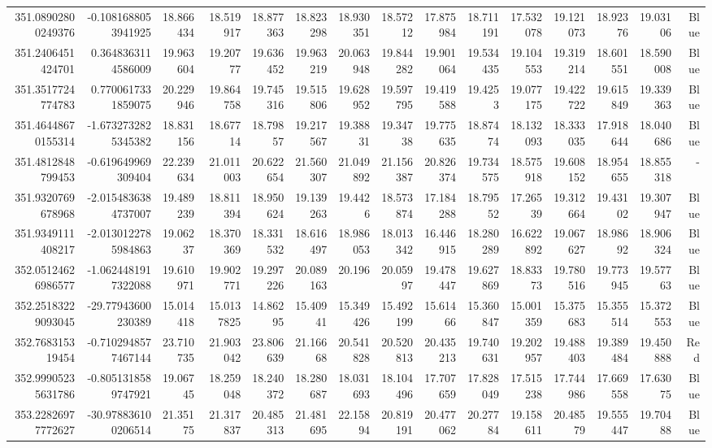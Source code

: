 \begin{center}
\begin{longtable}{rrrrrrrrrrrrrrr}
351.08902800249376 & -0.1081688053941925 & 18.866434 & 18.519917 & 18.877363 & 18.823298 & 18.930351 & 18.57212 & 17.875984 & 18.711191 & 17.532078 & 19.121073 & 18.92376 & 19.03106 & Blue \\
351.2406451424701 & 0.3648363114586009 & 19.963604 & 19.20777 & 19.636452 & 19.963219 & 20.063948 & 19.844282 & 19.901064 & 19.534435 & 19.104553 & 19.319214 & 18.601551 & 18.590008 & Blue \\
351.3517724774783 & 0.7700617331859075 & 20.229946 & 19.864758 & 19.745316 & 19.515806 & 19.628952 & 19.597795 & 19.419588 & 19.4253 & 19.077175 & 19.422722 & 19.615849 & 19.339363 & Blue \\
351.46448670155314 & -1.6732732825345382 & 18.831156 & 18.67714 & 18.79857 & 19.217567 & 19.38831 & 19.34738 & 19.775635 & 18.87474 & 18.132093 & 18.333035 & 17.918644 & 18.040686 & Blue \\
351.4812848799453 & -0.619649969309404 & 22.239634 & 21.011003 & 20.622654 & 21.560307 & 21.049892 & 21.156387 & 20.826374 & 19.734575 & 18.575918 & 19.608152 & 18.954655 & 18.855318 & - \\
351.9320769678968 & -2.0154836384737007 & 19.489239 & 18.811394 & 18.950624 & 19.139263 & 19.4426 & 18.573874 & 17.184288 & 18.79552 & 17.26539 & 19.312664 & 19.43102 & 19.307947 & Blue \\
351.9349111408217 & -2.0130122785984863 & 19.06237 & 18.370369 & 18.331532 & 18.616497 & 18.986053 & 18.013342 & 16.446915 & 18.280289 & 16.622892 & 19.067627 & 18.98692 & 18.906324 & Blue \\
352.05124626986577 & -1.0624481917322088 & 19.610971 & 19.902771 & 19.297226 & 20.089163 & 20.196 & 20.05997 & 19.478447 & 19.627869 & 18.83373 & 19.780516 & 19.773945 & 19.57763 & Blue \\
352.25183229093045 & -29.77943600230389 & 15.014418 & 15.0137825 & 14.86295 & 15.40941 & 15.349426 & 15.492199 & 15.61466 & 15.360847 & 15.001359 & 15.375683 & 15.355514 & 15.372553 & Blue \\
352.768315319454 & -0.7102948577467144 & 23.710735 & 21.903042 & 23.806639 & 21.16668 & 20.541828 & 20.520813 & 20.435213 & 19.740631 & 19.202957 & 19.488403 & 19.389484 & 19.450888 & Red \\
352.99905235631786 & -0.8051318589747921 & 19.06745 & 18.259048 & 18.240372 & 18.280687 & 18.031693 & 18.104496 & 17.707659 & 17.828049 & 17.515238 & 17.744986 & 17.669558 & 17.63075 & Blue \\
353.22826977772627 & -30.978836100206514 & 21.35175 & 21.317837 & 20.485313 & 21.481695 & 22.15894 & 20.819191 & 20.477062 & 20.27784 & 19.158611 & 20.48579 & 19.555447 & 19.70488 & Blue \\

\end{longtable}
\end{center}
